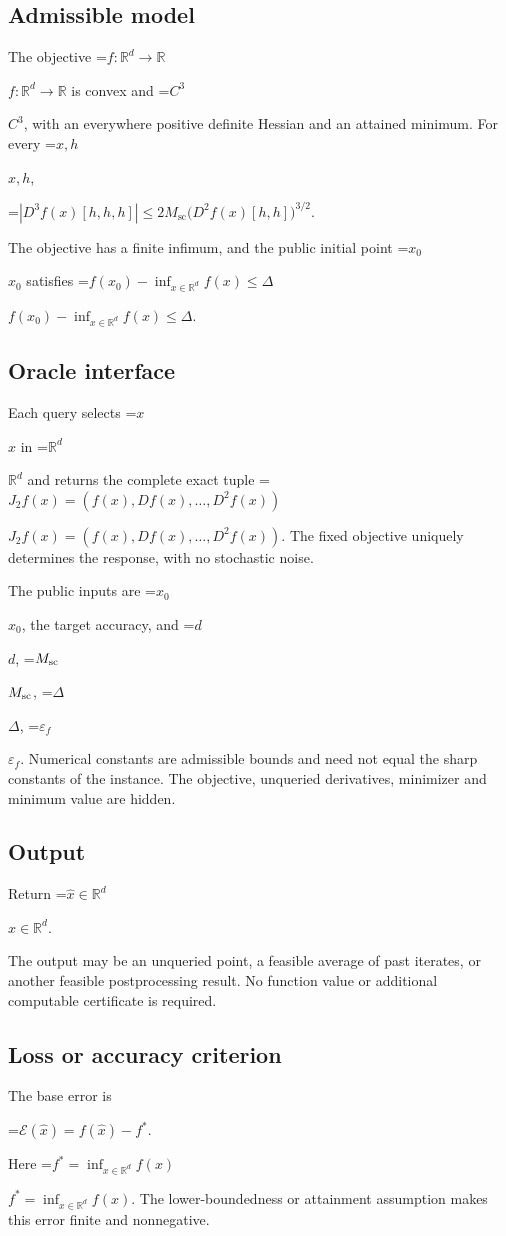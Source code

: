 \documentclass[10pt,a4paper]{article}
\newcommand{\AtlasMath}[1]{\par\begingroup\centering\setbox0=\hbox{$\displaystyle #1$}\ifdim\wd0>1.4\linewidth\typeout{ATLAS WIDE FORMULA: \the\wd0}\fi\ifdim\wd0>\linewidth\resizebox{\linewidth}{!}{\box0}\else\box0\fi\par\endgroup}
\newcommand{\AtlasInlineMath}[1]{\begingroup\setbox0=\hbox{$#1$}\ifdim\wd0>.4\linewidth\endgroup\AtlasMath{#1}\else\endgroup$#1$\fi}
\begin{document}
\subsection{Admissible model}
The objective \AtlasInlineMath{f:\mathbb{R}^d\to\mathbb{R}} is convex and \AtlasInlineMath{C^3}, with an everywhere positive definite Hessian and an attained minimum. For every \AtlasInlineMath{x,h},


\AtlasMath{|D^3f(x)[h,h,h]|\le2M_{\mathrm{sc}}\bigl(D^2f(x)[h,h]\bigr)^{3/2}.}


The objective has a finite infimum, and the public initial point \AtlasInlineMath{x_0} satisfies \AtlasInlineMath{f(x_0)-\inf_{x\in \mathbb{R}^d}f(x)\le\Delta}.

\subsection{Oracle interface}
Each query selects \AtlasInlineMath{x} in \AtlasInlineMath{\mathbb{R}^d} and returns the complete exact tuple \AtlasInlineMath{J_{2}f(x)=(f(x),Df(x),\ldots,D^{2}f(x))}. The fixed objective uniquely determines the response, with no stochastic noise.

The public inputs are \AtlasInlineMath{x_0}, the target accuracy, and \AtlasInlineMath{d}, \AtlasInlineMath{M_{\rm sc}}, \AtlasInlineMath{\Delta}, \AtlasInlineMath{\varepsilon_f}. Numerical constants are admissible bounds and need not equal the sharp constants of the instance. The objective, unqueried derivatives, minimizer and minimum value are hidden.

\subsection{Output}
Return \AtlasInlineMath{\widehat{x}\in \mathbb{R}^d}.

The output may be an unqueried point, a feasible average of past iterates, or another feasible postprocessing result. No function value or additional computable certificate is required.

\subsection{Loss or accuracy criterion}
The base error is


\AtlasMath{\mathcal{E}(\widehat{x})=f(\widehat{x})-f^*.}


Here \AtlasInlineMath{f^*=\inf_{x\in \mathbb{R}^d}f(x)}. The lower-boundedness or attainment assumption makes this error finite and nonnegative.
\end{document}
